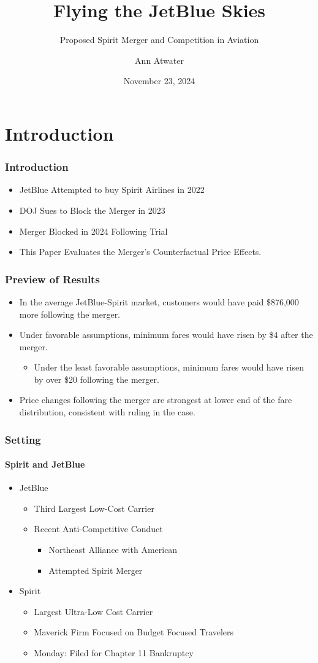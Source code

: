\documentclass[xcolor=dvipsnames]{beamer}
\author{Ann Atwater}
\institute{University of Florida}
\title{Flying the JetBlue Skies}
\subtitle{Proposed Spirit Merger and Competition in Aviation}
\date{November 23, 2024}
\begin{document}
	\section{Introduction}
	\frame{\titlepage}
		
	\begin{frame}
		\frametitle{Introduction}
		\begin{itemize}
			\item JetBlue Attempted to buy Spirit Airlines in 2022
			\item DOJ Sues to Block the Merger in 2023
			\item Merger Blocked in 2024 Following Trial 
			\item This Paper Evaluates the Merger's Counterfactual Price Effects. 
		\end{itemize}
	\end{frame}
	
	\begin{frame}
		\frametitle{Preview of Results}
		\begin{itemize}
			\item  In the average JetBlue-Spirit market, customers would have paid \$876,000 more following the merger. 
			\item Under favorable assumptions, minimum fares would have risen by \$4 after the merger.
			\begin{itemize}
				\item Under the least favorable assumptions, minimum fares would have risen by over \$20 following the merger. 
			\end{itemize}
			\item Price changes following the merger are strongest at lower end of the fare distribution, consistent with ruling in the case.
		\end{itemize}
	\end{frame}
		
	\begin{frame}
		\frametitle{Setting}
		\framesubtitle{Spirit and JetBlue}
			\begin{itemize}
			\item JetBlue 
			\begin{itemize}
				\item Third Largest Low-Cost Carrier 
				\item Recent Anti-Competitive Conduct
				\begin{itemize}
					\item Northeast Alliance with American
					\item Attempted Spirit Merger
				\end{itemize}
			\end{itemize}
			\item Spirit 
			\begin{itemize}
				\item Largest Ultra-Low Cost Carrier
				\item Maverick Firm Focused on Budget Focused Travelers 
				\item Monday: Filed for Chapter 11 Bankruptcy
			\end{itemize}
		\end{itemize} 
	\end{frame}
\end{document}
